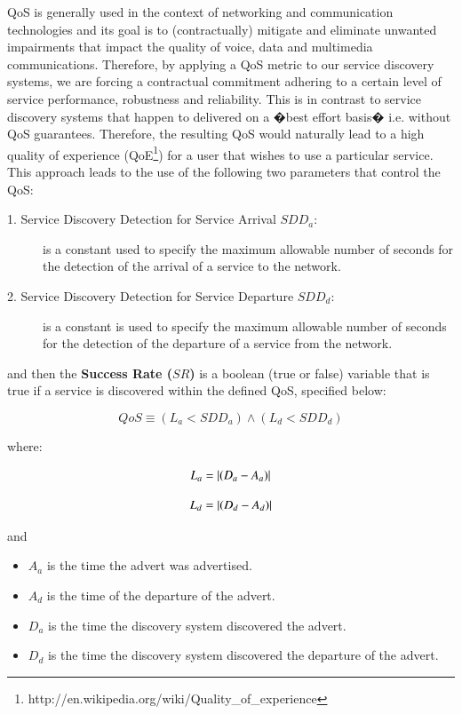 QoS is generally used in the context of networking and communication technologies and its goal is to (contractually) mitigate and eliminate unwanted impairments that impact the quality of voice, data and multimedia communications. Therefore, by applying a QoS metric to our service discovery systems, we are forcing a contractual commitment adhering to a certain level of service performance, robustness and reliability. This is in contrast to service discovery systems that happen to delivered on a �best effort basis�  i.e. without QoS guarantees. Therefore, the resulting QoS would naturally lead to a high quality of experience (QoE\footnote{http://en.wikipedia.org/wiki/Quality\_of\_experience}) for a user that wishes to use a particular service. This approach leads to the use of the following two parameters that control the QoS:

\begin{description}
\item[1. Service Discovery Detection for Service Arrival $SDD_{a}$:]   is a constant used to specify the maximum allowable number of seconds for the detection of the arrival of a service to the network.   
\item[2. Service Discovery Detection for Service Departure $SDD_{d}$:]   is a constant  is used to specify the maximum allowable number of seconds for the detection of the departure of a service from the network.    
\end{description}

\noindent and then the \textbf{Success Rate ($SR$)}  is a boolean (true or false) variable that is true if a service is discovered within the defined QoS,  specified below:


\begin{equation}\label{qos}
QoS \equiv (L_a < SDD_a) \wedge (L_d<SDD_d) 
\end {equation} 

where:

\begin{equation}\label{discovery-latency}
L_a= \vert(D_a - A_a)\vert 
\end {equation} 

\begin{equation}\label{leaving-latency}
L_d= \vert(D_d - A_d)\vert 
\end {equation} 

\noindent and

\begin{itemize}
\item \textbf{$A_a$} is the time the advert was advertised. 
\item \textbf{$A_d$} is the time of the departure of the advert. 
\item \textbf{$D_a$} is the time the discovery system discovered the advert. 
\item \textbf{$D_d$} is the time the discovery system discovered the departure of the advert. 
\end{itemize}

